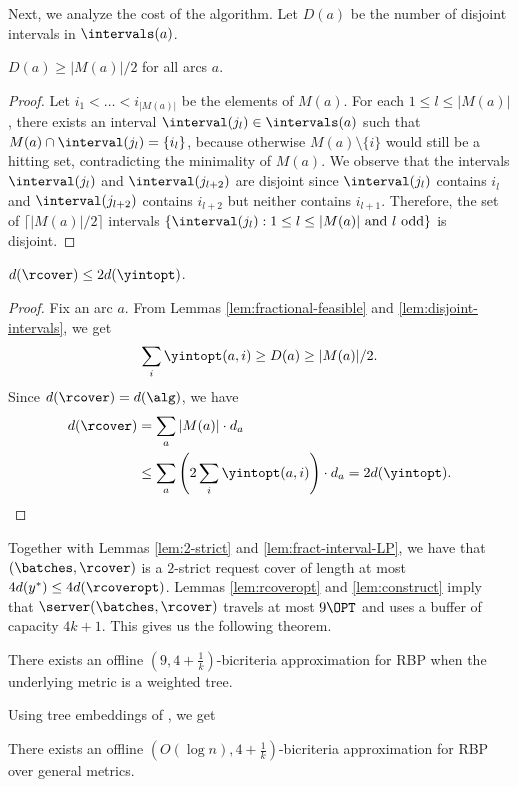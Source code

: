 Next, we analyze the cost of the algorithm. Let $D(a)$ be the number
of disjoint intervals in $\intervals(a)$.
\begin{lemma}
  \label{lem:disjoint-intervals}
  $D(a) \geq |M(a)|/2$ for all arcs $a$.
\end{lemma}

\begin{proof}
  Let $i_1 < \ldots < i_{|M(a)|}$ be the elements of $M(a)$. For each
  $1 \leq l \leq |M(a)|$, there exists an interval $\interval(j_{l})
  \in \intervals(a)$ such that $M(a) \cap \interval(j_{l}) =
  \{i_{l}\}$, because otherwise $M(a) \setminus \{i\}$ would still be
  a hitting set, contradicting the minimality of $M(a)$. We observe
  that the intervals $\interval(j_{l})$ and $\interval(j_{l+2})$ are
  disjoint since $\interval(j_l)$ contains $i_l$ and
  $\interval(j_{l+2})$ contains $i_{l+2}$ but neither contains
  $i_{l+1}$. Therefore, the set of $\lceil |M(a)|/2 \rceil$ intervals
  $\{\interval(j_{l}) : \text{$1 \leq l \leq |M(a)|$ and $l$ odd}\}$
  is disjoint.  
\end{proof}







\begin{lemma}
$d(\rcover) \leq 2 d(\yintopt)$.
\end{lemma}

\begin{proof}
  Fix an arc $a$. From Lemmas \ref{lem:fractional-feasible} and
  \ref{lem:disjoint-intervals}, we get
  \[\sum_i \yintopt(a,i) \geq D(a) \geq |M(a)|/2.\]
  Since $d(\rcover) = d(\alg)$, we have
  \begin{align*}
    d(\rcover) 
&= \sum_a |M(a)| \cdot d_a\\
    &\leq \sum_a \left(2\sum_i \yintopt(a,i)\right) \cdot d_a 
    = 2d(\yintopt).
  \end{align*} 
\end{proof}






Together with Lemmas \ref{lem:2-strict} and
\ref{lem:fract-interval-LP}, we have that $(\batches, \rcover)$ is a
$2$-strict request cover of length at most $4d(y^*) \leq
4d(\rcoveropt)$. Lemmas \ref{lem:rcoveropt} and \ref{lem:construct}
imply that $\server(\batches, \rcover)$ travels at most $9\OPT$ and
uses a buffer of capacity $4k+1$. This gives us the following theorem.

\begin{theorem}
  \label{thm:trees}
  There exists an offline $\left(9, 4+\frac{1}{k}\right)$-bicriteria
  approximation for RBP when the underlying metric is a weighted tree.
\end{theorem}
Using tree embeddings of \cite{FRT}, we get
\begin{theorem}
  \label{thm:general}
  There exists an offline $\left(O(\log n),
    4+\frac{1}{k}\right)$-bicriteria approximation for RBP over
  general metrics.
\end{theorem}